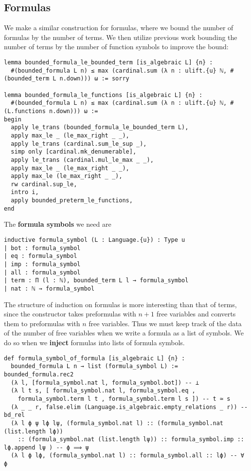 \subsection{Formulas}

We make a similar construction for formulas,
where we bound the number of formulas by the number of terms.
We then utilize previous work bounding the number of terms by the
number of function symbols to improve the bound:
\begin{lstlisting}
lemma bounded_formula_le_bounded_term [is_algebraic L] {n} :
  #(bounded_formula L n) ≤ max (cardinal.sum (λ n : ulift.{u} ℕ, #(bounded_term L n.down))) ω := sorry

lemma bounded_formula_le_functions [is_algebraic L] {n} :
  #(bounded_formula L n) ≤ max (cardinal.sum (λ n : ulift.{u} ℕ, #(L.functions n.down))) ω :=
begin
  apply le_trans (bounded_formula_le_bounded_term L),
  apply max_le _ (le_max_right _ _),
  apply le_trans (cardinal.sum_le_sup _),
  simp only [cardinal.mk_denumerable],
  apply le_trans (cardinal.mul_le_max _ _),
  apply max_le _ (le_max_right _ _),
  apply max_le (le_max_right _ _),
  rw cardinal.sup_le,
  intro i,
  apply bounded_preterm_le_functions,
end \end{lstlisting}

The \textbf{formula symbols} we need are

\begin{lstlisting}
inductive formula_symbol (L : Language.{u}) : Type u
| bot : formula_symbol
| eq : formula_symbol
| imp : formula_symbol
| all : formula_symbol
| term : Π (l : ℕ), bounded_term L l → formula_symbol
| nat : ℕ → formula_symbol \end{lstlisting}

The structure of induction on formulas is more interesting than
that of terms, since the constructor  takes preformulas with $n + 1$ free variables and converts them to
preformulas with $n$ free variables.
Thus we must keep track of the data of the number of free variables
when we write a formula as a list of symbols.
We do so when we \textbf{inject} formulas into lists of formula symbols.

\begin{lstlisting}
def formula_symbol_of_formula [is_algebraic L] {n} :
  bounded_formula L n → list (formula_symbol L) :=
bounded_formula.rec2
  (λ l, [formula_symbol.nat l, formula_symbol.bot]) -- ⊥
  (λ l t s, [ formula_symbol.nat l, formula_symbol.eq ,
    formula_symbol.term l t , formula_symbol.term l s ]) -- t ≃ s
  (λ _ _ r, false.elim (Language.is_algebraic.empty_relations _ r)) -- bd_rel
  (λ l ϕ ψ lϕ lψ, (formula_symbol.nat l) :: (formula_symbol.nat (list.length lϕ))
    :: (formula_symbol.nat (list.length lψ)) :: formula_symbol.imp :: lϕ.append lψ ) -- ϕ ⟹ ψ
  (λ l ϕ lϕ, (formula_symbol.nat l) :: formula_symbol.all :: lϕ) -- ∀ ϕ \end{lstlisting}

